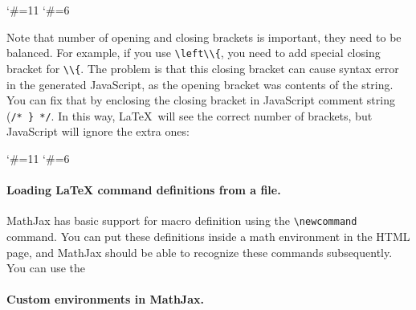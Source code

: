\begin{texsource}
\catcode`\#=11
\catcode`\#=6

\EndPreamble
\end{texsource}

Note that number of opening and closing brackets is important, they need to be balanced. 
For example, if you use \verb|\left\\{|, you need to add special closing bracket for \verb|\\{|. 
The problem is that this closing bracket can cause syntax error in the generated JavaScript, 
as the opening bracket was contents of the string. You can fix that by enclosing the closing bracket
in JavaScript comment string (\verb|/* } */|. In this way, \LaTeX\ will see the correct number of brackets,
but JavaScript will ignore the extra ones:

\begin{texsource}
\catcode`\#=11
\catcode`\#=6

\EndPreamble
\end{texsource}

\paragraph{Loading \LaTeX{} command definitions from a file.}

MathJax has basic support for macro definition using 
the \verb|\newcommand|  command. You can put these definitions inside a math
environment in the HTML page, and MathJax should be able to recognize
these commands subsequently. You can use the 





\paragraph{Custom environments in MathJax.}\label{sec:mathjax_env}

